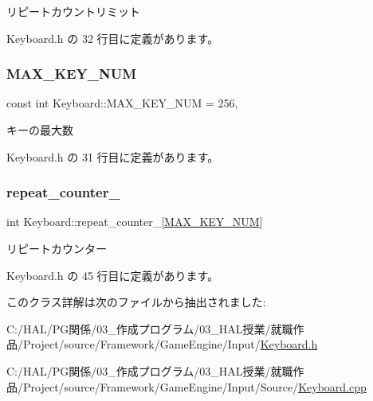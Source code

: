 リピートカウントリミット 



 Keyboard.\+h の 32 行目に定義があります。

\mbox{\label{class_keyboard_ab151afccd1372a53748e225c7c98e65e}} 
\subsubsection{\texorpdfstring{M\+A\+X\+\_\+\+K\+E\+Y\+\_\+\+N\+UM}{MAX\_KEY\_NUM}}
{\footnotesize\ttfamily const int Keyboard\+::\+M\+A\+X\+\_\+\+K\+E\+Y\+\_\+\+N\+UM = 256\hspace{0.3cm}{\ttfamily [static]}, {\ttfamily [private]}}



キーの最大数 



 Keyboard.\+h の 31 行目に定義があります。

\mbox{\label{class_keyboard_a1f97dc50d345892d74a8960d79b7d6bc}} 
\subsubsection{\texorpdfstring{repeat\+\_\+counter\+\_\+}{repeat\_counter\_}}
{\footnotesize\ttfamily int Keyboard\+::repeat\+\_\+counter\+\_\+\mbox{[}\mbox{\hyperlink{class_keyboard_ab151afccd1372a53748e225c7c98e65e}{M\+A\+X\+\_\+\+K\+E\+Y\+\_\+\+N\+UM}}\mbox{]}\hspace{0.3cm}{\ttfamily [private]}}



リピートカウンター 



 Keyboard.\+h の 45 行目に定義があります。



このクラス詳解は次のファイルから抽出されました\+:\begin{DoxyCompactItemize}
\item 
C\+:/\+H\+A\+L/\+P\+G関係/03\+\_\+作成プログラム/03\+\_\+\+H\+A\+L授業/就職作品/\+Project/source/\+Framework/\+Game\+Engine/\+Input/\mbox{\hyperlink{_keyboard_8h}{Keyboard.\+h}}\item 
C\+:/\+H\+A\+L/\+P\+G関係/03\+\_\+作成プログラム/03\+\_\+\+H\+A\+L授業/就職作品/\+Project/source/\+Framework/\+Game\+Engine/\+Input/\+Source/\mbox{\hyperlink{_keyboard_8cpp}{Keyboard.\+cpp}}\end{DoxyCompactItemize}
